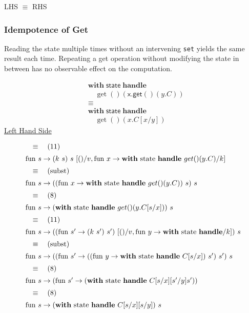 \documentclass[logo,bsc,singlespacing,parskip]{infthesis}
\begin{document}
LHS $\equiv$ RHS

\subsubsection*{Idempotence of Get}
Reading the state multiple times without an intervening \lstinline{set} yields the same result each time. Repeating a get operation without modifying the state in between has no observable effect on the computation.


\[
\begin{aligned}
    &\mathsf{\textbf{with}} \; \mathsf{state} \; \mathsf{\textbf{handle}} \\
    &\quad \operatorname{get}() \left( \mathsf{x.get}() \left( y.C \right) \right) \\
    &\equiv \\
    &\mathsf{\textbf{with}} \; \mathsf{state} \; \mathsf{\textbf{handle}} \\
    &\quad \operatorname{get}() \left( x.C[x/y] \right)
\end{aligned}
\]
\underline{Left Hand Side}

\[ 
\begin{array}{l}
\quad\equiv\quad (11) \\[5pt]
\text{fun } s \rightarrow (k\ s)\ s\ [()/v, \text{fun } x \rightarrow \text{\textbf{with} state \textbf{handle} } get()(y.C)/k] \\[5pt]
\quad\equiv\quad (\text{subst}) \\[5pt]
\text{fun } s \rightarrow ((\text{fun } x \rightarrow \text{\textbf{with} state \textbf{handle} } get()(y.C))\ s)\ s \\[5pt]
\quad\equiv\quad (8) \\[5pt]
\text{fun } s \rightarrow (\text{\textbf{with} state \textbf{handle} } get()(y.C[s/x]))\ s \\[5pt]
\quad\equiv\quad (11) \\[5pt]
\text{fun } s \rightarrow ((\text{fun } s'\rightarrow (k\ s')\ s')\ [()/v, \text{fun } y\rightarrow \text{\textbf{with} state \textbf{handle}}/k])\ s \\[5pt]
\quad\equiv\quad (\text{subst}) \\[5pt]
\text{fun } s \rightarrow ((\text{fun } s' \rightarrow (( \text{fun } y \rightarrow \text{\textbf{with} state \textbf{handle} } C[s/x])\ s')\ s')\ s \\[5pt]
\quad\equiv\quad (8) \\[5pt]
\text{fun } s \rightarrow (\text{fun } s' \rightarrow (\text{\textbf{with} state \textbf{handle} } C[s/x][s'/y]s')) \\[5pt]
\quad\equiv\quad (8) \\[5pt]
\text{fun } s \rightarrow (\text{\textbf{with} state \textbf{handle} } C[s/x][s/y])\ s
\end{array}
\]
\end{document}
